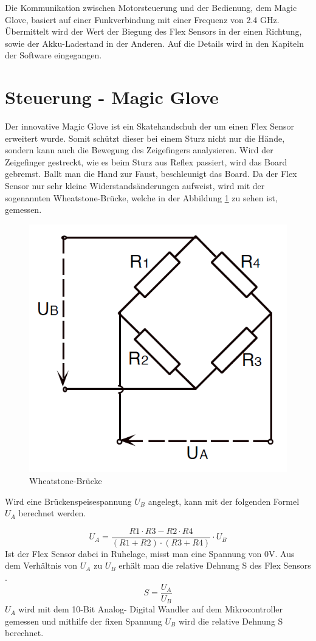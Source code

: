 Die Kommunikation zwischen Motorsteuerung und der Bedienung, dem Magic Glove, basiert auf einer Funkverbindung mit einer Frequenz von 2.4 GHz. Übermittelt wird der Wert der Biegung des Flex Sensors in der einen Richtung, sowie der Akku-Ladestand in der Anderen. Auf die Details wird in den Kapiteln der Software eingegangen.


\section{Steuerung - Magic Glove}
\label{HW_MagicGlove}
Der innovative Magic Glove ist ein Skatehandschuh der um einen Flex Sensor erweitert wurde. Somit schützt dieser bei einem Sturz nicht nur die Hände, sondern kann auch die Bewegung des Zeigefingers analysieren. Wird der Zeigefinger gestreckt, wie es beim Sturz aus Reflex passiert, wird das Board gebremst. Ballt man die Hand zur Faust, beschleunigt das Board.
Da der Flex Sensor nur sehr kleine Widerstandsänderungen aufweist, wird mit der sogenannten Wheatstone-Brücke, welche in der Abbildung \ref{fig:wheatstonebruecke} zu sehen ist, gemessen.
\begin{figure} [H]
	\centering
	\includegraphics[width=.7\linewidth]{images/wheatstone_Bruecke}
	\caption{Wheatstone-Brücke}
	\label{fig:wheatstonebruecke}
\end{figure}
Wird eine Brückenspeisespannung $U_B$ angelegt, kann mit der folgenden Formel $U_A$ berechnet werden. 

\begin{equation}\label{glg_U_A}
 U_A=\frac{R1 \cdot R3-R2 \cdot R4}{(R1+R2) \cdot (R3+R4)} \cdot U_B 
\end{equation}
Ist der Flex Sensor dabei in Ruhelage, misst man eine Spannung von 0V. Aus dem Verhältnis von $ U_A $ zu $ U_B $ erhält man die relative Dehnung S des Flex Sensors .
\begin{equation}\label{S_relativeDehnung}
S=\frac{U_A}{U_B}
\end{equation}
$U_A$ wird mit dem 10-Bit Analog- Digital Wandler auf dem Mikrocontroller gemessen und mithilfe der fixen Spannung $U_B$ wird die relative Dehnung S berechnet. 


